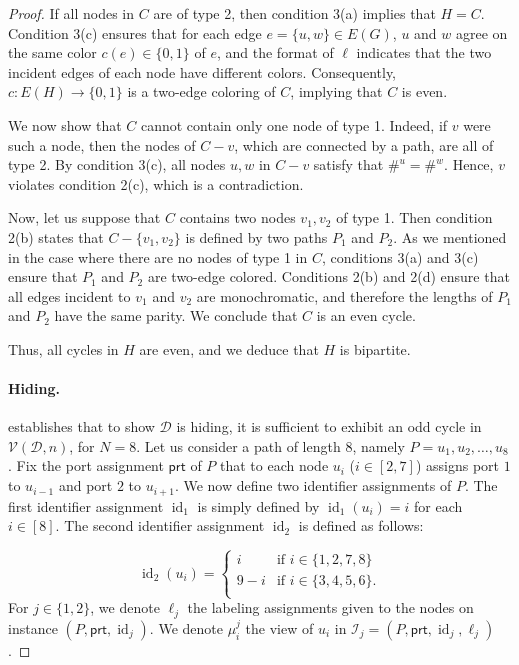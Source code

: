 \documentclass[11pt]{article}
\DeclareMathOperator{\id}{id}
\newcommand*{\alvgd}{\mathcal{V}(\mathcal{D},n)}
\newcommand*{\ports}{\mathsf{prt}}
\begin{document}
\begin{proof}
If all nodes in \( C \) are of type 2, then condition 3(a) implies that \( H = C \). Condition 3(c) ensures that for each edge \( e = \{u,w\} \in E(G) \), \( u \) and \( w \) agree on the same color \( c(e) \in \{0,1\} \) of \( e \), and the format of \( \ell \) indicates that the two incident edges of each node have different colors. Consequently, \( c: E(H) \rightarrow \{0,1\} \) is a two-edge coloring of \( C \), implying that \( C \) is even. 

We now show that \( C \) cannot contain only one node of type 1. Indeed, if \( v \) were such a node, then the nodes of \( C - v \), which are connected by a path, are all of type 2. By condition 3(c), all nodes \( u, w \) in \( C - v \) satisfy that \( \#^u = \#^w \). Hence, \( v \) violates condition 2(c), which is a contradiction. 

Now, let us suppose that \( C \) contains two nodes \( v_1, v_2 \) of type 1. Then condition 2(b) states that \( C - \{v_1, v_2\} \) is defined by two paths \( P_1 \) and \( P_2 \). As we mentioned in the case where there are no nodes of type 1 in \( C \), conditions 3(a) and 3(c) ensure that \( P_1 \) and \( P_2 \) are two-edge colored. Conditions 2(b) and 2(d) ensure that all edges incident to \( v_1 \) and \( v_2 \) are monochromatic, and therefore the lengths of \( P_1 \) and \( P_2 \) have the same parity. We conclude that \( C \) is an even cycle. 

Thus, all cycles in \( H \) are even, and we deduce that \( H \) is bipartite.

\paragraph{Hiding.}  establishes that to show \( \mathcal{D} \) is hiding, it is sufficient to exhibit an odd cycle in \( \alvgd \), for  \( N= 8 \). Let us consider a path of length $8$, namely $P = u_1, u_2, \dots, u_8$. Fix the port assignment  $\ports$ of $P$  that to each node $u_i$ ($i \in [2,7]$) assigns port $1$ to $u_{i-1}$ and port $2$ to $u_{i+1}$. We now define two identifier assignments of $P$. The first identifier assignment $\id_1$ is simply defined by
$\id_1(u_i) = i$ for each $i \in [8]$. The second identifier assignment $\id_2$ is defined as follows:

\[\id_2(u_i) = \begin{cases} 
i & \text{if } i \in \{1,2,7,8\} \\
9-i & \text{if } i \in \{3,4,5,6\}.\\
\end{cases}\]
For  $j\in \{1,2\}$, we denote $\ell_j$  the labeling assignments given to the nodes on instance $(P, \ports, \id_j)$. We denote $\mu^j_i$ the view of $u_i$ in $\mathcal{I}_j  = (P, \ports, \id_j, \ell_j)$. 


\end{proof}
\end{document}
